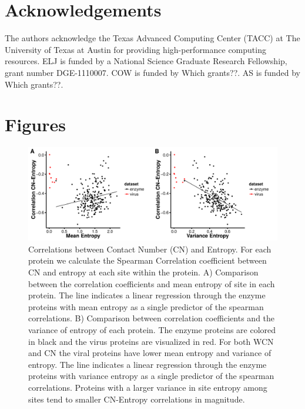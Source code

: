 \documentclass[12pt]{article}
\begin{document}
\section{Acknowledgements}
The authors acknowledge the Texas Advanced Computing Center (TACC) at The University of Texas at Austin for providing high-performance computing resources. ELJ is funded by a National Science Graduate Research Fellowship, grant number DGE-1110007. COW is funded by {\color{red} Which grants??}.  AS is funded by {\color{red} Which grants??}.


\cleardoublepage
\section*{Figures}

    \begin{figure}[H]
            \centerline{\includegraphics[width=7.5in]{entropy_cn_cor.pdf}}     
            \caption{Correlations between Contact Number (CN) and Entropy. For each protein we calculate the Spearman Correlation coefficient between CN and entropy at each site within the protein. A) Comparison between the correlation coefficients and mean entropy of site in each protein. The line indicates a linear regression through the enzyme proteins with mean entropy as a single predictor of the spearman correlations. B) Comparison between correlation coefficients and the variance of entropy of each protein. The enzyme proteins are colored in black and the virus proteins are visualized in red. For both WCN and CN the viral proteins have lower mean entropy and variance of entropy. The line indicates a linear regression through the enzyme proteins with variance entropy as a single predictor of the spearman correlations. Proteins with a larger variance in site entropy among sites tend to smaller CN-Entropy correlations in magnitude. }
            \label{fig:entropy_cn_cor}
    \end{figure}
\end{document}

